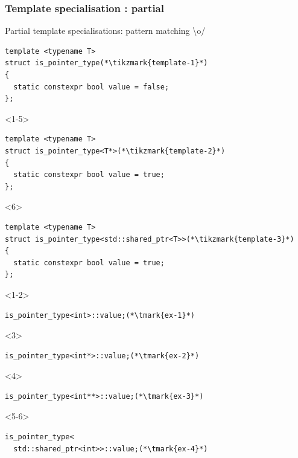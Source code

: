 \documentclass[14pt]{beamer}
\begin{document}
\begin{frame}[fragile]
  \frametitle{Template specialisation : partial}

  {\changefontsize{12pt}
  Partial template specialisations: pattern matching \textbackslash{}o/}

  \begin{overlayarea}{\textwidth}{5cm}
  \begin{lstlisting}[basicstyle=\codefontsize{10pt}]
template <typename T>
struct is_pointer_type(*\tikzmark{template-1}*)
{
  static constexpr bool value = false;
};
  \end{lstlisting}

  \begin{onlyenv}<1-5>
  \begin{lstlisting}[basicstyle=\codefontsize{10pt}]
template <typename T>
struct is_pointer_type<T*>(*\tikzmark{template-2}*)
{
  static constexpr bool value = true;
};
  \end{lstlisting}
  \end{onlyenv}

  \begin{onlyenv}<6>
  \begin{lstlisting}[basicstyle=\codefontsize{10pt}]
template <typename T>
struct is_pointer_type<std::shared_ptr<T>>(*\tikzmark{template-3}*)
{
  static constexpr bool value = true;
};
  \end{lstlisting}
  \end{onlyenv}
  \end{overlayarea}

  \begin{overlayarea}{\textwidth}{2cm}
    \begin{onlyenv}<1-2>
      \begin{lstlisting}[basicstyle=\codefontsize{10pt}]
is_pointer_type<int>::value;(*\tmark{ex-1}*)
      \end{lstlisting}
    \end{onlyenv}
    \begin{onlyenv}<3>
      \begin{lstlisting}[basicstyle=\codefontsize{10pt}]
is_pointer_type<int*>::value;(*\tmark{ex-2}*)
      \end{lstlisting}
    \end{onlyenv}
    \begin{onlyenv}<4>
      \begin{lstlisting}[basicstyle=\codefontsize{10pt}]
is_pointer_type<int**>::value;(*\tmark{ex-3}*)
      \end{lstlisting}
    \end{onlyenv}
    \begin{onlyenv}<5-6>
      \begin{lstlisting}[basicstyle=\codefontsize{10pt}]
is_pointer_type<
  std::shared_ptr<int>>::value;(*\tmark{ex-4}*)
      \end{lstlisting}
    \end{onlyenv}
  \end{overlayarea}


\end{frame}
\end{document}
